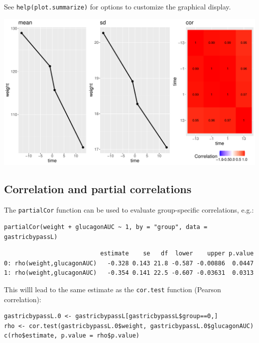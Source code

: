 \documentclass[12pt]{article}
\begin{document}
See \texttt{help(plot.summarize)} for options to customize the graphical
display.

\begin{center}
\includegraphics[trim={0 0 0 0},width=1\textwidth]{./figures/summarize.pdf}
\end{center}

\clearpage

\subsection{Correlation and partial correlations}
\label{sec:org2360066}

The \texttt{partialCor} function can be used to evaluate group-specific
correlations, e.g.:
\lstset{language=r,label= ,caption= ,captionpos=b,numbers=none}
\begin{lstlisting}
partialCor(weight + glucagonAUC ~ 1, by = "group", data = gastricbypassL)
\end{lstlisting}

\begin{verbatim}
                           estimate    se   df  lower    upper p.value
0: rho(weight,glucagonAUC)   -0.328 0.143 21.8 -0.587 -0.00886  0.0447
1: rho(weight,glucagonAUC)   -0.354 0.141 22.5 -0.607 -0.03631  0.0313
\end{verbatim}


This willl lead to the same estimate as the \texttt{cor.test} function
(Pearson correlation):
\lstset{language=r,label= ,caption= ,captionpos=b,numbers=none}
\begin{lstlisting}
gastricbypassL.0 <- gastricbypassL[gastricbypassL$group==0,]
rho <- cor.test(gastricbypassL.0$weight, gastricbypassL.0$glucagonAUC)
c(rho$estimate, p.value = rho$p.value)
\end{lstlisting}
\end{document}
